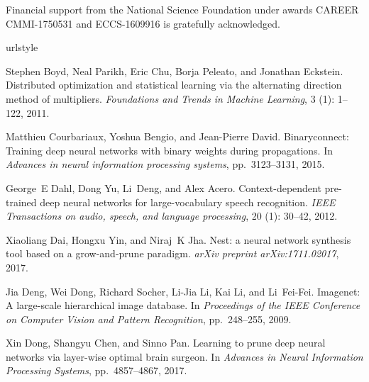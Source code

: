 \documentclass{article} %
\begin{document}
Financial support from the National Science Foundation under
awards CAREER CMMI-1750531 and ECCS-1609916 is gratefully acknowledged.


\begin{thebibliography}{36}
\providecommand{\natexlab}[1]{#1}
\providecommand{\url}[1]{\texttt{#1}}
\expandafter\ifx\csname urlstyle\endcsname\relax
  \providecommand{\doi}[1]{doi: #1}\else
  \providecommand{\doi}{doi: \begingroup \urlstyle{rm}\Url}\fi

Stephen Boyd, Neal Parikh, Eric Chu, Borja Peleato, and Jonathan Eckstein.
\newblock Distributed optimization and statistical learning via the alternating
  direction method of multipliers.
\newblock \emph{Foundations and Trends{\textregistered} in Machine Learning},
  3 (1): 1--122, 2011.

Matthieu Courbariaux, Yoshua Bengio, and Jean-Pierre David.
\newblock Binaryconnect: Training deep neural networks with binary weights
  during propagations.
\newblock In \emph{Advances in neural information processing systems}, pp.\  3123--3131, 2015.

George~E Dahl, Dong Yu, Li~Deng, and Alex Acero.
\newblock Context-dependent pre-trained deep neural networks for
  large-vocabulary speech recognition.
\newblock \emph{IEEE Transactions on audio, speech, and language processing},
  20 (1): 30--42, 2012.

Xiaoliang Dai, Hongxu Yin, and Niraj~K Jha.
\newblock Nest: a neural network synthesis tool based on a grow-and-prune
  paradigm.
\newblock \emph{arXiv preprint arXiv:1711.02017}, 2017.

Jia Deng, Wei Dong, Richard Socher, Li-Jia Li, Kai Li, and Li~Fei-Fei.
\newblock Imagenet: A large-scale hierarchical image database.
\newblock In \emph{Proceedings of the IEEE Conference on Computer Vision and
  Pattern Recognition}, pp.\ 248--255, 2009.

Xin Dong, Shangyu Chen, and Sinno Pan.
\newblock Learning to prune deep neural networks via layer-wise optimal brain
  surgeon.
\newblock In \emph{Advances in Neural Information Processing Systems}, pp.\  4857--4867, 2017.


\end{thebibliography}
\end{document}
